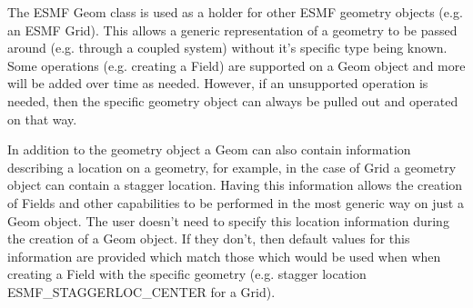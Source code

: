 %

The ESMF Geom class is used as a holder for other ESMF geometry objects (e.g. an ESMF Grid). This allows a generic
representation of a geometry to be passed around (e.g. through a coupled system) without it's specific type being known.
Some operations (e.g. creating a Field) are supported on a Geom object and more will be added over time as needed. However, if
an unsupported operation is needed, then the specific geometry object can always be pulled out and operated on that way.

In addition to the geometry object a Geom can also contain information describing a location on a geometry, for example, in the case of
Grid a geometry object can contain a stagger location. Having this information allows the creation of Fields and other capabilities to
be performed in the most generic way on just a Geom object. The user doesn't need to specify this location information during the
creation of a Geom object. If they don't, then default values for this information are provided which match those which would
be used when when creating a Field with the specific geometry (e.g. stagger location ESMF\_STAGGERLOC\_CENTER for a Grid).
